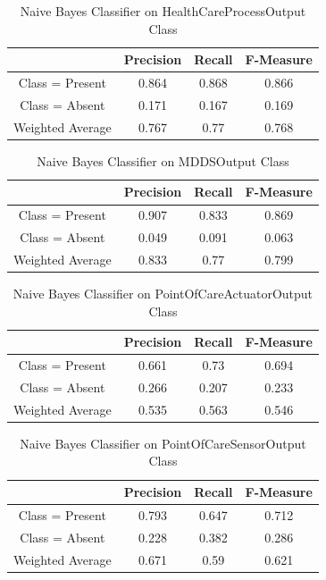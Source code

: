 \documentclass[11pt, notitlepage,abstracton,oneside]{article}   	%
\begin{document}
\begin{table}[htdp]
\caption{Naive Bayes Classifier on HealthCareProcessOutput Class}
\begin{center}
\begin{tabular}{|c|c|c|c|}
\hline
& Precision & Recall & F-Measure \\ \hline
Class = Present & 0.864 & 0.868 & 0.866 \\ \hline
Class = Absent & 0.171 & 0.167 & 0.169 \\ \hline
Weighted Average & 0.767 & 0.77 & 0.768 \\ \hline
\end{tabular}
\end{center}
\label{default}
\end{table}%

\begin{table}[htdp]
\caption{Naive Bayes Classifier on MDDSOutput Class}
\begin{center}
\begin{tabular}{|c|c|c|c|}
\hline
& Precision & Recall & F-Measure \\ \hline
Class = Present & 0.907 & 0.833 & 0.869 \\ \hline
Class = Absent & 0.049 & 0.091 & 0.063 \\ \hline
Weighted Average & 0.833 & 0.77 & 0.799 \\ \hline
\end{tabular}
\end{center}
\label{default}
\end{table}%

\begin{table}[htdp]
\caption{Naive Bayes Classifier on PointOfCareActuatorOutput Class}
\begin{center}
\begin{tabular}{|c|c|c|c|}
\hline
& Precision & Recall & F-Measure \\ \hline
Class = Present & 0.661 & 0.73 & 0.694 \\ \hline
Class = Absent & 0.266 & 0.207 & 0.233 \\ \hline
Weighted Average & 0.535 & 0.563 & 0.546 \\ \hline
\end{tabular}
\end{center}
\label{default}
\end{table}%

\begin{table}[htdp]
\caption{Naive Bayes Classifier on PointOfCareSensorOutput Class}
\begin{center}
\begin{tabular}{|c|c|c|c|}
\hline
& Precision & Recall & F-Measure \\ \hline
Class = Present & 0.793 & 0.647 & 0.712 \\ \hline
Class = Absent & 0.228 & 0.382 & 0.286 \\ \hline
Weighted Average & 0.671 & 0.59 & 0.621 \\ \hline
\end{tabular}
\end{center}
\label{default}
\end{table}%
\end{document}
